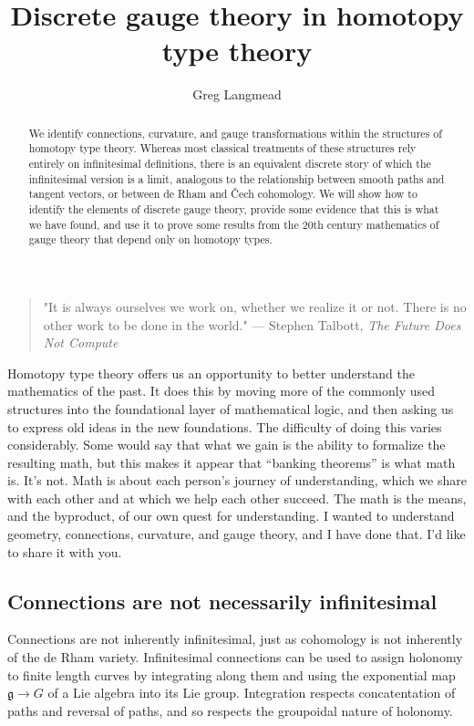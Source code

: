 \documentclass[12pt]{article}
\title{Discrete gauge theory in homotopy type theory}
\author{Greg Langmead}
\begin{document}
\begin{abstract}
We identify connections, curvature, and gauge transformations within the structures of homotopy type theory. Whereas most classical treatments of these structures rely entirely on infinitesimal definitions, there is an equivalent discrete story of which the infinitesimal version is a limit, analogous to the relationship between smooth paths and tangent vectors, or between de Rham and Čech cohomology. We will show how to identify the elements of discrete gauge theory, provide some evidence that this is what we have found, and use it to prove some results from the 20th century mathematics of gauge theory that depend only on homotopy types.
\end{abstract}


\begin{quote} 
\centering 
"It is always ourselves we work on, whether we realize it or not. There is no other work to be done in the world." --- Stephen Talbott, \emph{The Future Does Not Compute}\cite{talbott}
\end{quote}

Homotopy type theory offers us an opportunity to better understand the mathematics of the past. It does this by moving more of the commonly used structures into the foundational layer of mathematical logic, and then asking us to express old ideas in the new foundations. The difficulty of doing this varies considerably. Some would say that what we gain is the ability to formalize the resulting math, but this makes it appear that ``banking theorems'' is what math is. It's not. Math is about each person's journey of understanding, which we share with each other and at which we help each other succeed. The math is the means, and the byproduct, of our own quest for understanding. I wanted to understand geometry, connections, curvature, and gauge theory, and I have done that. I'd like to share it with you.

\subsection{Connections are not necessarily infinitesimal}

Connections are not inherently infinitesimal, just as cohomology is not inherently of the de Rham variety. Infinitesimal connections can be used to assign holonomy to finite length curves by integrating along them and using the exponential map \( \mathfrak{g}\to G \) of a Lie algebra into its Lie group. Integration respects concatentation of paths and reversal of paths, and so respects the groupoidal nature of holonomy.
\end{document}
